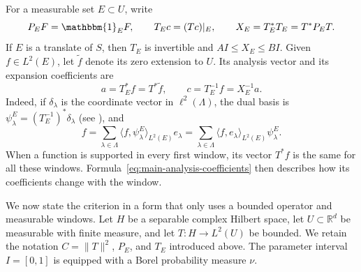 \documentclass[12pt,reqno,tbtags]{amsart}
\def\R{\mathbb{R}}
\newcommand\norm[1]{\|#1\|}
\newcommand\Inpro[3]{\langle #1,#2\rangle_{#3}}
\newcommand\1{\mathbbm{1}}
\begin{document}
For a measurable set $E\subset U$, write
\begin{equation*}
    P_EF=\1_EF,\qquad T_Ec=(Tc)|_E,
    \qquad X_E=T_E^*T_E=T^*P_ET.
\end{equation*}
If $E$ is a translate of $S$, then $T_E$ is invertible and
$AI\le X_E\le BI$. Given $f\in L^2(E)$, let $\widetilde f$ denote its zero
extension to $U$. Its analysis vector and its expansion coefficients are
\begin{equation}\label{eq:main-analysis-coefficients}
    a=T_E^*f=T^*\widetilde f,
    \qquad c=T_E^{-1}f=X_E^{-1}a.
\end{equation}
Indeed, if $\delta_\lambda$ is the coordinate vector in $\ell^2(\Lambda)$,
the dual basis is $\psi_\lambda^E=(T_E^{-1})^*\delta_\lambda$
(see \cite{OU16}), and
\begin{equation*}
    f=\sum_{\lambda\in\Lambda}\Inpro{f}{\psi_\lambda^E}{L^2(E)}e_\lambda
     =\sum_{\lambda\in\Lambda}\Inpro{f}{e_\lambda}{L^2(E)}\psi_\lambda^E.
\end{equation*}
When a function is supported in every first window, its vector $T^*f$ is the
same for all these windows. Formula~\eqref{eq:main-analysis-coefficients}
then describes how its coefficients change with the window.

We now state the criterion in a form that only uses a bounded operator and
measurable windows. Let $H$ be a separable complex Hilbert space, let
$U\subset\R^d$ be measurable with finite measure, and let
$T:H\to L^2(U)$ be bounded. We retain the notation $C=\norm{T}^2$,
$P_E$, and $T_E$ introduced above. The parameter interval $I=[0,1]$ is
equipped with a Borel probability measure $\nu$.
\end{document}
